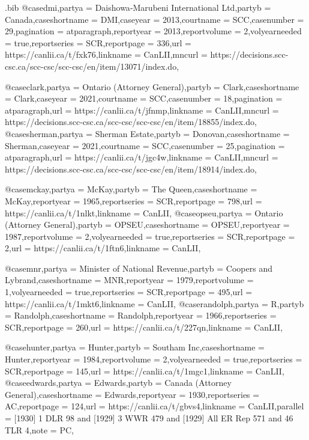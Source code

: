 \begin{filecontents*}[overwrite]{\jobname.bib}
@case{dmi,partya =  {Daishowa‑Marubeni International Ltd},partyb =  {Canada},caseshortname =  {DMI},caseyear =  {2013},courtname =  {SCC},casenumber =  {29},pagination =  {atparagraph},reportyear =  {2013},reportvolume =  {2},volyearneeded =  {true},reportseries =  {SCR},reportpage =  {336},url =  {https://canlii.ca/t/fxk76},linkname =  {CanLII},mncurl =  {https://decisions.scc-csc.ca/scc-csc/scc-csc/en/item/13071/index.do},}


@case{clark,partya =  {Ontario (Attorney General)},partyb =  {Clark},caseshortname =  {Clark},caseyear =  {2021},courtname =  {SCC},casenumber =  {18},pagination =  {atparagraph},url =  {https://canlii.ca/t/jfnmp},linkname =  {CanLII},mncurl =  {https://decisions.scc-csc.ca/scc-csc/scc-csc/en/item/18855/index.do},}
@case{sherman,partya =  {Sherman Estate},partyb =  {Donovan},caseshortname =  {Sherman},caseyear =  {2021},courtname =  {SCC},casenumber =  {25},pagination =  {atparagraph},url =  {https://canlii.ca/t/jgc4w},linkname =  {CanLII},mncurl =  {https://decisions.scc-csc.ca/scc-csc/scc-csc/en/item/18914/index.do},}


@case{mckay,partya =  {McKay},partyb =  {The Queen},caseshortname =  {McKay},reportyear =  {1965},reportseries =  {SCR},reportpage =  {798},url =  {https://canlii.ca/t/1nlkt},linkname =  {CanLII},}
@case{opseu,partya =  {Ontario (Attorney General)},partyb =  {OPSEU},caseshortname =  {OPSEU},reportyear =  {1987},reportvolume =  {2},volyearneeded =  {true},reportseries =  {SCR},reportpage =  {2},url =  {https://canlii.ca/t/1ftn6},linkname =  {CanLII},}


@case{mnr,partya =  {Minister of National Revenue},partyb =  {Coopers and Lybrand},caseshortname =  {MNR},reportyear =  {1979},reportvolume =  {1},volyearneeded =  {true},reportseries =  {SCR},reportpage =  {495},url =  {https://canlii.ca/t/1mkt6},linkname =  {CanLII},}
@case{randolph,partya =  {R},partyb =  {Randolph},caseshortname =  {Randolph},reportyear =  {1966},reportseries =  {SCR},reportpage =  {260},url =  {https://canlii.ca/t/227qn},linkname =  {CanLII},}


@case{hunter,partya =  {Hunter},partyb =  {Southam Inc},caseshortname =  {Hunter},reportyear =  {1984},reportvolume =  {2},volyearneeded =  {true},reportseries =  {SCR},reportpage =  {145},url =  {https://canlii.ca/t/1mgc1},linkname =  {CanLII},}
@case{edwards,partya =  {Edwards},partyb =  {Canada (Attorney General)},caseshortname =  {Edwards},reportyear =  {1930},reportseries =  {AC},reportpage =  {124},url =  {https://canlii.ca/t/gbvs4},linkname =  {CanLII},parallel =  { [1930] 1 DLR 98 and [1929] 3 WWR 479 and [1929] All ER Rep 571 and 46 TLR 4},note =  {PC},}


\end{filecontents*}
